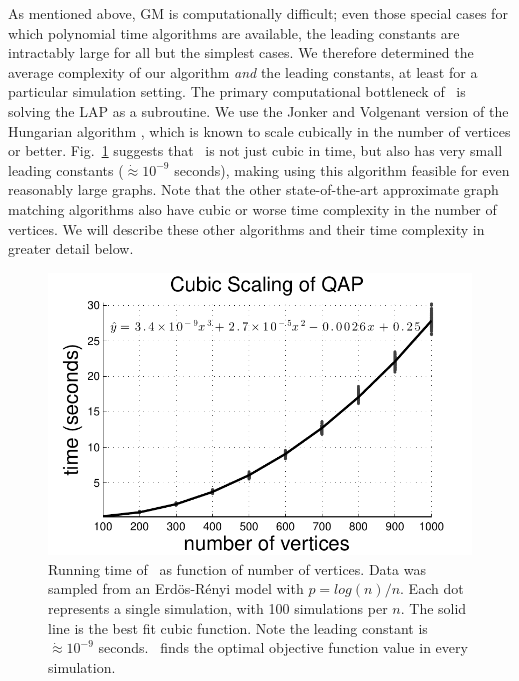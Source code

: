 \documentclass{article} %
\begin{document}
As mentioned above, GM is computationally difficult; even those special cases for which polynomial time algorithms are available, the leading constants are intractably large for all but the simplest cases. We therefore determined the average complexity of our algorithm \emph{and} the leading constants, at least for a particular simulation setting.  The primary computational bottleneck of \FAQ\  is solving the LAP as a subroutine.  We use the Jonker and Volgenant version of the Hungarian algorithm \cite{Burkard2009}, which is known to scale cubically in the number of vertices or better.  Fig.\ \ref{fig:scaling} suggests that \FAQ\  is not just cubic in time, but also has very small leading constants ($\dot{\approx} 10^{-9}$ seconds), making using this algorithm feasible for even reasonably large graphs.  Note that the other state-of-the-art approximate graph matching algorithms also have cubic or worse time complexity in the number of vertices.  We will describe these other algorithms and their time complexity in greater detail below.



\begin{figure}
	\centering			
	\includegraphics[width=0.3\linewidth]{../figs/ErdosRenyi_results.pdf}
	\caption{Running time of \FAQ\  as function of number of vertices. Data was sampled from an Erd\"os-R\'enyi model with $p=log(n)/n$.  Each dot represents a single simulation, with 100 simulations per $n$.  The solid line is the best fit cubic function.  Note the leading constant is $\dot{\approx} 10^{-9}$ seconds. \FAQ\  finds the optimal objective function value in every simulation.}
	\label{fig:scaling}
	\vspace{-5pt}
\end{figure}
\end{document}
